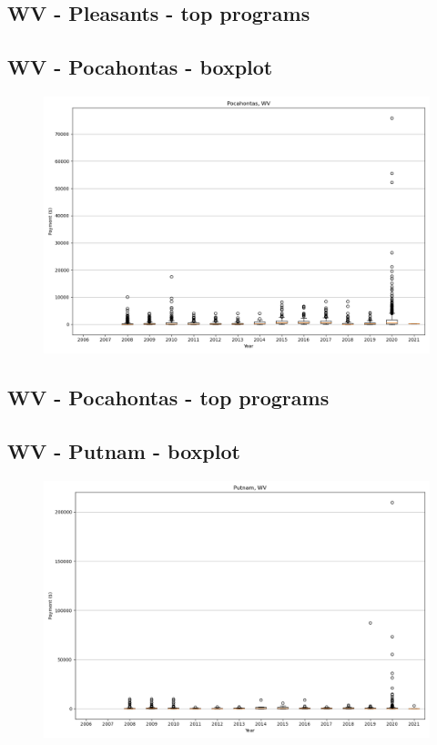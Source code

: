 \subsection*{WV - Pleasants - top programs}

\newpage
\subsection*{WV - Pocahontas - boxplot}
\begin{figure}[h]
\centering
\includegraphics[width=7in]{../output/boxplots/counties/Pocahontas-WV_boxplot.png}
\end{figure}


\subsection*{WV - Pocahontas - top programs}

\newpage
\subsection*{WV - Putnam - boxplot}
\begin{figure}[h]
\centering
\includegraphics[width=7in]{../output/boxplots/counties/Putnam-WV_boxplot.png}
\end{figure}



